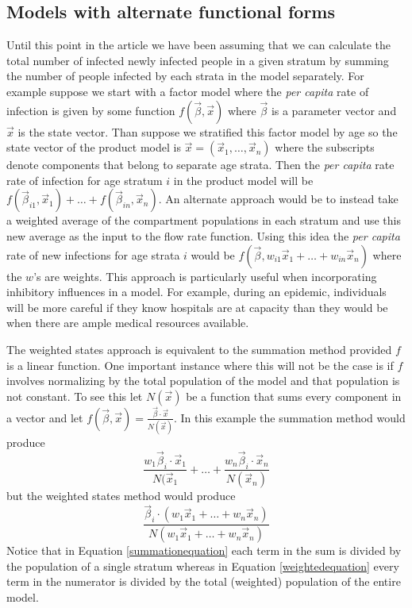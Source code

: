 \documentclass[pdflatex,sn-basic]{sn-jnl}%
\theoremstyle{definition}
\newcommand{\betavec}{\vec{\beta}}
\newcommand{\xvec}{\vec{x}}
\begin{document}
\subsection{Models with alternate functional forms}\label{aff}
Until this point in the article we have been assuming that we can calculate the total number of infected newly infected people in a given stratum by summing the number of people infected by each strata in the model separately. For example suppose we start with a factor model where the \emph{per capita} rate of infection is given by some function $f(\betavec, \xvec)$ where $\betavec$ is a parameter vector and $\xvec$ is the state vector. Than suppose we stratified this factor model by age so the state vector of the product model is $\xvec = (\xvec_1, \ldots, \xvec_n)$ where the subscripts denote components that belong to separate age strata. Then the \emph{per capita} rate rate of infection for age stratum $i$ in the product model will be $f(\betavec_{i1}, \xvec_1) + \ldots + f(\betavec_{in}, \xvec_n)$. An alternate approach would be to instead take a weighted average of the compartment populations in each stratum and use this new average as the input to the flow rate function. Using this idea the \emph{per capita} rate of new infections for age strata $i$ would be $f(\betavec, w_{i1}\xvec_1 + \ldots + w_{in}\xvec_n)$ where the $w$'s are weights. This approach is particularly useful when incorporating inhibitory influences in a model. For example, during an epidemic, individuals will be more careful if they know hospitals are at capacity than they would be when there are ample medical resources available. 

The weighted states approach is equivalent to the summation method provided $f$ is a linear function. One important instance where this will not be the case is if $f$ involves normalizing by the total population of the model and that population is not constant. To see this let $N(\xvec)$ be a function that sums every component in a vector and let $f(\betavec, \xvec) = \frac{\betavec \cdot \xvec}{N(\xvec)}$. In this example the summation method would produce 
\begin{equation}\label{summationequation}
\frac{w_1\betavec_{i}\cdot \xvec_1}{N(\xvec_1} + \ldots + \frac{w_n\betavec_{i}\cdot \xvec_n}{N(\xvec_n)}
\end{equation}\label{weightedequation}
but the weighted states method would produce
\begin{equation}
    \frac{\betavec_i \cdot (w_1\xvec_1+\ldots + w_n\xvec_n)}{N(w_1\xvec_1+\ldots + w_n\xvec_n)}
\end{equation}
Notice that in Equation \ref{summationequation} each term in the sum is divided by the population of a single stratum whereas in Equation \ref{weightedequation} every term in the numerator is divided by the total (weighted) population of the entire model. 
\end{document}
